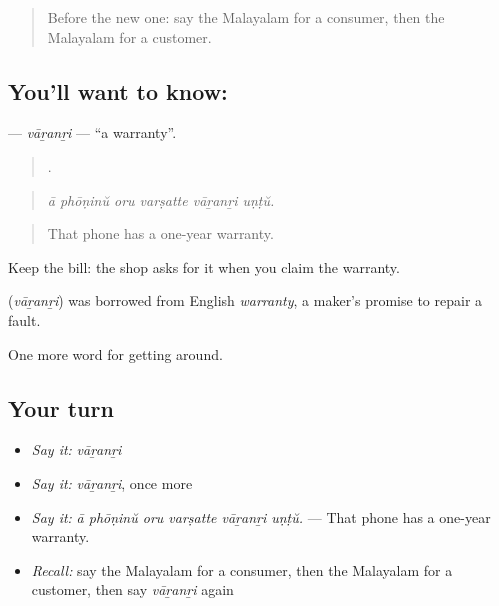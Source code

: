 \label{lesson:ML-C493-varanri}



\begin{quote}
Before the new one: say the Malayalam for a consumer, then the Malayalam for a customer.
\end{quote}

\subsection*{You'll want to know: }
\textbf{} — \emph{vāṟanṟi} — \textquotedblleft{}a warranty\textquotedblright{}.

\begin{quote}
     .
\end{quote}

\begin{quote}
\emph{ā phōṇinŭ oru varṣatte vāṟanṟi uṇṭŭ.}
\end{quote}

\begin{quote}
That phone has a one-year warranty.
\end{quote}

Keep the bill: the shop asks for it when you claim the warranty.

\begin{cousinweb}
\textbf{} (\emph{vāṟanṟi}) was borrowed from English \emph{warranty}, a maker's promise to repair a fault.
\end{cousinweb}

\begin{grammarlens}[title={What you've built}]
One more word for getting around.
\end{grammarlens}

\subsection*{Your turn}
\begin{itemize}
\raggedright
  \item \emph{Say it:} \emph{vāṟanṟi}
  \item \emph{Say it:} \emph{vāṟanṟi}, once more
  \item \emph{Say it:} \emph{ā phōṇinŭ oru varṣatte vāṟanṟi uṇṭŭ.} — That phone has a one-year warranty.
  \item \emph{Recall:} say the Malayalam for a consumer, then the Malayalam for a customer, then say \emph{vāṟanṟi} again
\end{itemize}

